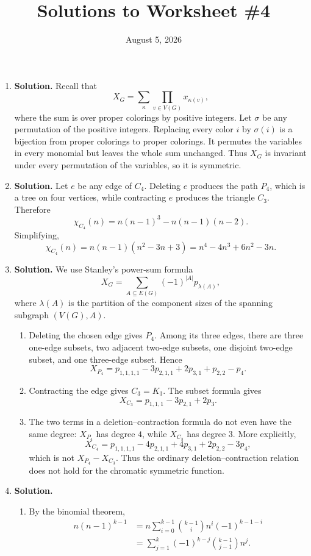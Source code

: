 \documentclass{article}
\title{Solutions to Worksheet \#4}
\author{}
\date{August 5, 2026}
\begin{document}
\maketitle
\begin{enumerate}
\item \textbf{Solution.}
Recall that
\[
X_G=\sum_{\kappa}\prod_{v\in V(G)}x_{\kappa(v)},
\]
where the sum is over proper colorings by positive integers.  Let
$\sigma$ be any permutation of the positive integers.  Replacing every
color $i$ by $\sigma(i)$ is a bijection from proper colorings to proper
colorings.  It permutes the variables in every monomial but leaves the
whole sum unchanged.  Thus $X_G$ is invariant under every permutation
of the variables, so it is symmetric.

\item \textbf{Solution.}
Let $e$ be any edge of $C_4$.  Deleting $e$ produces the path $P_4$,
which is a tree on four vertices, while contracting $e$ produces the
triangle $C_3$.  Therefore
\[
\chi_{C_4}(n)
=n(n-1)^3-n(n-1)(n-2).
\]
Simplifying,
\[
\boxed{\chi_{C_4}(n)
=n(n-1)(n^2-3n+3)
=n^4-4n^3+6n^2-3n.}
\]

\item \textbf{Solution.}
We use Stanley's power-sum formula
\[
X_G=\sum_{A\subseteq E(G)}(-1)^{|A|}p_{\lambda(A)},
\]
where $\lambda(A)$ is the partition of the component sizes of the
spanning subgraph $(V(G),A)$.
\begin{enumerate}
\item Deleting the chosen edge gives $P_4$.  Among its three edges,
there are three one-edge subsets, two adjacent two-edge subsets, one
disjoint two-edge subset, and one three-edge subset.  Hence
\[
\boxed{X_{P_4}
=p_{1,1,1,1}-3p_{2,1,1}+2p_{3,1}+p_{2,2}-p_4.}
\]

\item Contracting the edge gives $C_3=K_3$.  The subset formula gives
\[
\boxed{X_{C_3}=p_{1,1,1}-3p_{2,1}+2p_3.}
\]

\item The two terms in a deletion--contraction formula do not even
have the same degree: $X_{P_4}$ has degree $4$, while $X_{C_3}$ has
degree $3$.  More explicitly,
\[
X_{C_4}
=p_{1,1,1,1}-4p_{2,1,1}+4p_{3,1}+2p_{2,2}-3p_4,
\]
which is not $X_{P_4}-X_{C_3}$.  Thus the ordinary
deletion--contraction relation does not hold for the chromatic
symmetric function.
\end{enumerate}

\item \textbf{Solution.}
\begin{enumerate}
\item By the binomial theorem,
\[
\begin{aligned}
n(n-1)^{k-1}
&=n\sum_{i=0}^{k-1}\binom{k-1}{i}n^i(-1)^{k-1-i}\\
&=\boxed{\sum_{j=1}^{k}(-1)^{k-j}
\binom{k-1}{j-1}n^j}.
\end{aligned}
\]


\end{enumerate}
\end{enumerate}
\end{document}
